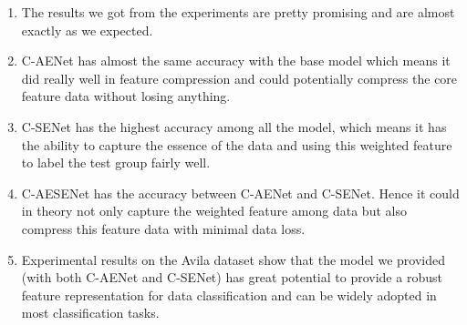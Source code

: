 \documentclass[12pt]{article}
\numberwithin{equation}{section}
\newenvironment{proof}{\begin{box_for_proof}}{\end{box_for_proof}}
\begin{document}
\vspace{10mm}
	
\begin{proof}
	\begin{enumerate}
		\item The results we got from the experiments are pretty promising and are almost exactly as we expected.
		\item C-AENet has almost the same accuracy with the base model which means it did really well in feature compression and could potentially compress the core feature data without losing anything. 
		\item C-SENet has the highest accuracy among all the model, which means it has the ability to capture the essence of the data and using this weighted feature to label the test group fairly well.
		\item C-AESENet has the accuracy between C-AENet and C-SENet. Hence it could in theory not only capture the weighted feature among data but also compress this feature data with minimal data loss.
		\item Experimental results on the Avila dataset show that the model we provided (with both C-AENet and C-SENet) has great potential to provide a robust feature representation for data classification and can be widely adopted in most classification tasks.
	\end{enumerate}
\end{proof}
\end{document}
